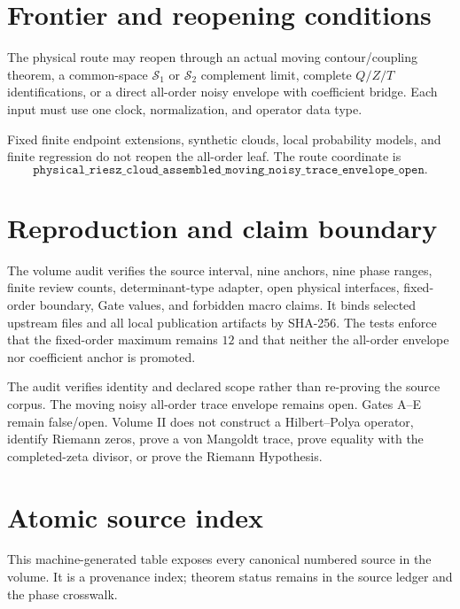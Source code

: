 \documentclass[11pt]{article}
\theoremstyle{definition}
\theoremstyle{remark}
\begin{document}
\section{Frontier and reopening conditions}

The physical route may reopen through an actual moving contour/coupling
theorem, a common-space $\mathcal S_1$ or $\mathcal S_2$ complement limit,
complete $Q/Z/T$ identifications, or a direct all-order noisy envelope with
coefficient bridge.  Each input must use one clock, normalization, and
operator data type.

Fixed finite endpoint extensions, synthetic clouds, local probability
models, and finite regression do not reopen the all-order leaf.  The route
coordinate is
\[
 \boxed{\texttt{physical\_riesz\_cloud\_assembled\_moving\_noisy\_trace\_envelope\_open}}.
\]

\section{Reproduction and claim boundary}

The volume audit verifies the source interval, nine anchors, nine phase
ranges, finite review counts, determinant-type adapter, open physical
interfaces, fixed-order boundary, Gate values, and forbidden macro claims.
It binds selected upstream files and all local publication artifacts by
SHA-256.  The tests enforce that the fixed-order maximum remains $12$ and
that neither the all-order envelope nor coefficient anchor is promoted.

The audit verifies identity and declared scope rather than re-proving the
source corpus.  The moving noisy all-order trace envelope remains open.
Gates A--E remain false/open.  Volume II does not construct a Hilbert--Polya
operator, identify Riemann zeros, prove a von Mangoldt trace, prove equality
with the completed-zeta divisor, or prove the Riemann Hypothesis.

\appendix
\section{Atomic source index}

This machine-generated table exposes every canonical numbered source in the
volume.  It is a provenance index; theorem status remains in the source
ledger and the phase crosswalk.


\end{document}

